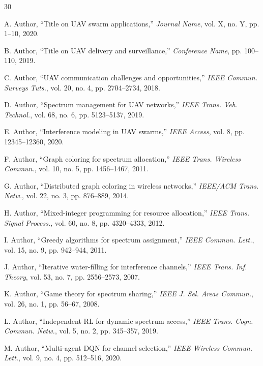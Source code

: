 \documentclass[conference]{IEEEtran}
\begin{document}
\begin{thebibliography}{30}

A. Author, ``Title on UAV swarm applications,'' \emph{Journal Name}, vol. X, no. Y, pp. 1--10, 2020.

B. Author, ``Title on UAV delivery and surveillance,'' \emph{Conference Name}, pp. 100--110, 2019.

C. Author, ``UAV communication challenges and opportunities,'' \emph{IEEE Commun. Surveys Tuts.}, vol. 20, no. 4, pp. 2704--2734, 2018.

D. Author, ``Spectrum management for UAV networks,'' \emph{IEEE Trans. Veh. Technol.}, vol. 68, no. 6, pp. 5123--5137, 2019.

E. Author, ``Interference modeling in UAV swarms,'' \emph{IEEE Access}, vol. 8, pp. 12345--12360, 2020.

F. Author, ``Graph coloring for spectrum allocation,'' \emph{IEEE Trans. Wireless Commun.}, vol. 10, no. 5, pp. 1456--1467, 2011.

G. Author, ``Distributed graph coloring in wireless networks,'' \emph{IEEE/ACM Trans. Netw.}, vol. 22, no. 3, pp. 876--889, 2014.

H. Author, ``Mixed-integer programming for resource allocation,'' \emph{IEEE Trans. Signal Process.}, vol. 60, no. 8, pp. 4320--4333, 2012.

I. Author, ``Greedy algorithms for spectrum assignment,'' \emph{IEEE Commun. Lett.}, vol. 15, no. 9, pp. 942--944, 2011.

J. Author, ``Iterative water-filling for interference channels,'' \emph{IEEE Trans. Inf. Theory}, vol. 53, no. 7, pp. 2556--2573, 2007.

K. Author, ``Game theory for spectrum sharing,'' \emph{IEEE J. Sel. Areas Commun.}, vol. 26, no. 1, pp. 56--67, 2008.

L. Author, ``Independent RL for dynamic spectrum access,'' \emph{IEEE Trans. Cogn. Commun. Netw.}, vol. 5, no. 2, pp. 345--357, 2019.

M. Author, ``Multi-agent DQN for channel selection,'' \emph{IEEE Wireless Commun. Lett.}, vol. 9, no. 4, pp. 512--516, 2020.


\end{thebibliography}
\end{document}
